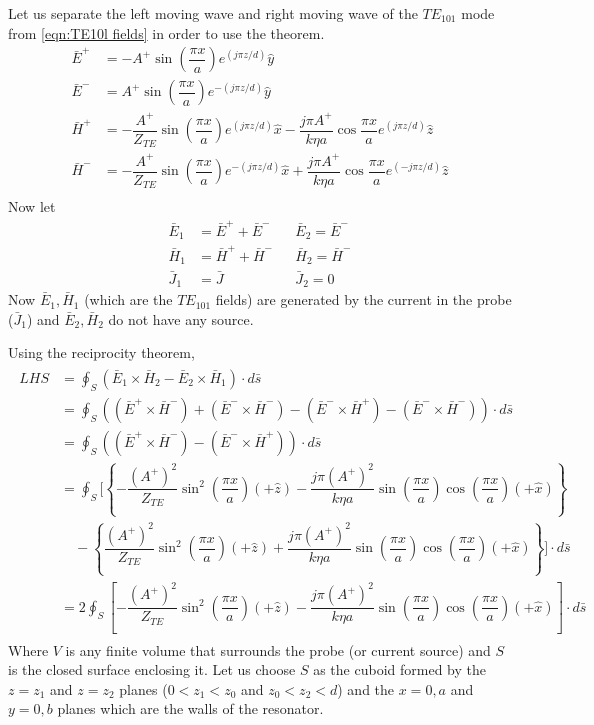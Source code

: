 Let us separate the left moving wave and right moving wave of the $TE_{101}$ mode from \ref{eqn:TE10l fields} in order to use the theorem.
\begin{subequations}
\begin{align}
\bar{E}^+&=-A^+\sin\left(\dfrac{\pi x}{a}\right)e^{(j\pi z/d)} \hat{y}\\
\bar{E}^-&=A^+\sin\left(\dfrac{\pi x}{a}\right)e^{-(j\pi z/d)} \hat{y}\\
\bar{H}^+&=-\dfrac{A^+}{Z_{TE}}\sin\left(\dfrac{\pi x}{a}\right)e^{(j\pi z/d)} \hat{x}-\dfrac{j\pi A^+}{k\eta a}\cos\dfrac{\pi x}{a}e^{(j\pi z/d)} \hat{z}\\
\bar{H}^-&=-\dfrac{A^+}{Z_{TE}}\sin\left(\dfrac{\pi x}{a}\right)e^{-(j\pi z/d)} \hat{x}+\dfrac{j\pi A^+}{k\eta a}\cos\dfrac{\pi x}{a}e^{(-j\pi z/d)} \hat{z}\\
\end{align}
\end{subequations}
Now let
\begin{align}
\bar{E}_1&=\bar{E}^++\bar{E}^-&&\bar{E}_2=\bar{E}^-\\
\bar{H}_1&=\bar{H}^++\bar{H}^-&&\bar{H}_2=\bar{H}^-\\
\bar{J}_1&=\bar{J}&&\bar{J}_2=0
\end{align}
Now $\bar{E}_1,\bar{H}_1$ (which are the $TE_{101}$ fields) are generated by the current in the probe ($\bar{J}_1$) and $\bar{E}_2,\bar{H}_2$ do not have any source.

Using the reciprocity theorem,
\begin{align}
\begin{split}
\label{eqn:lhs reciprocity}
LHS&=\oint_S \left( \bar{E}_1 \times\bar{H}_2 - \bar{E}_2 \times\bar{H}_1\right)\cdot d\bar{s}\\
&= \oint_S \left( (\bar{E}^+ \times\bar{H}^-) +(\bar{E}^- \times\bar{H}^-) - (\bar{E}^- \times\bar{H}^+)-(\bar{E}^- \times\bar{H}^-)\right)\cdot d\bar{s}\\
&=\oint_S \left( (\bar{E}^+ \times\bar{H}^-) - (\bar{E}^- \times\bar{H}^+)\right)\cdot d\bar{s}\\
&=\oint_S\biggl[ \left\lbrace-\dfrac{(A^+)^2}{Z_{TE}}\sin^2\left(\dfrac{\pi x}{a}\right)(+\hat{z})-\dfrac{j\pi (A^+)^2}{k\eta a}\sin\left(\dfrac{\pi x}{a}\right)\cos\left(\dfrac{\pi x}{a}\right)(+\hat{x})\right\rbrace\\
&\quad-\left\lbrace\dfrac{(A^+)^2}{Z_{TE}}\sin^2\left(\dfrac{\pi x}{a}\right)(+\hat{z})+\dfrac{j\pi (A^+)^2}{k\eta a}\sin\left(\dfrac{\pi x}{a}\right)\cos\left(\dfrac{\pi x}{a}\right)(+\hat{x})\right\rbrace\biggr]\cdot d\bar{s}\\
&=2\oint_S \left[-\dfrac{(A^+)^2}{Z_{TE}}\sin^2\left(\dfrac{\pi x}{a}\right)(+\hat{z})-\dfrac{j\pi (A^+)^2}{k\eta a}\sin\left(\dfrac{\pi x}{a}\right)\cos\left(\dfrac{\pi x}{a}\right)(+\hat{x})\right]\cdot d\bar{s}
\end{split}
\end{align}
Where $V$ is any finite volume that surrounds the probe (or current source) and $S$ is the closed surface enclosing it. Let us choose $S$ as the cuboid formed by the $z=z_1$ and $z=z_2$ planes ($0<z_1<z_0$ and $z_0<z_2<d$) and the $x=0,a$ and $y=0,b$ planes which are the walls of the resonator.

